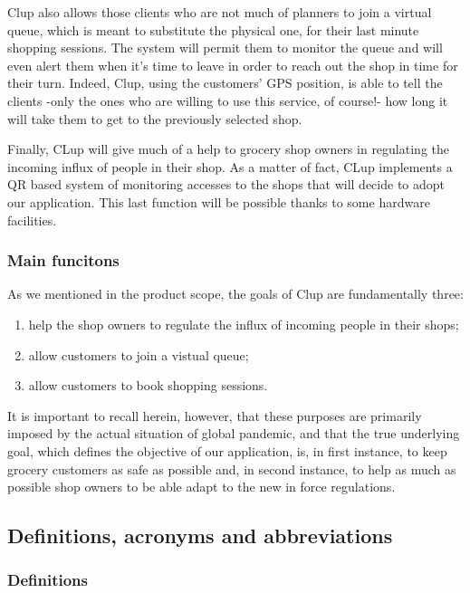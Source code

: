 Clup also allows those clients who are not much of planners to join a virtual queue, which is meant to substitute the physical one, for their last minute shopping sessions. The system will permit them to monitor the queue and will even alert them when it’s time to leave in order to reach out the shop in time for their turn. Indeed, Clup, using the customers’ GPS position, is able to tell the clients -only the ones who are willing to use this service, of course!- how long it will take them to get to the previously selected shop.

Finally, CLup will give much of a help to grocery shop owners in regulating the incoming influx of people in their shop. As a matter of fact, CLup implements a QR based system of monitoring accesses to the shops that will decide to adopt our application. This last function will be possible thanks to some hardware facilities.

\subsubsection{Main funcitons}
\label{subsect:mainfunctions}

As we mentioned in the product scope, the goals of Clup are fundamentally three: 
\begin{enumerate}
    \item help the shop owners to regulate the influx of incoming people in their shops;
    \item allow customers to join a vistual queue;
    \item allow customers to book shopping sessions.
\end{enumerate}

It is important to recall herein, however, that these purposes are primarily imposed by the actual situation of global pandemic, and that the true underlying goal, which defines the objective of our application, is, in first instance, to keep grocery customers as safe as possible and, in second instance, to help as much as possible shop owners to be able adapt to the new in force regulations.

\subsection{Definitions, acronyms and abbreviations}
\label{subsect:definitionsacronymsabbreviations}

\subsubsection{Definitions}
\label{subsect:definitions}

